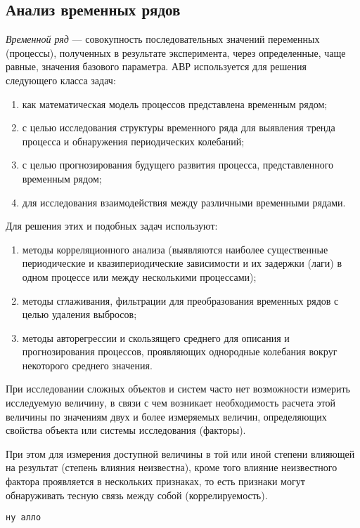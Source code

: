 \documentclass[12pt]{article}
\begin{document}
\subsection{Анализ временных рядов}
\emph{Временной ряд} --- совокупность последовательных значений переменных (процессы), полученных в результате эксперимента, через определенные, чаще равные, значения базового параметра. АВР используется для решения следующего класса задач:
\begin{enumerate}
    \item как математическая модель процессов представлена временным рядом;
    \item с целью исследования структуры временного ряда для выявления тренда процесса и обнаружения периодических колебаний;
    \item с целью прогнозирования будущего развития процесса, представленного временным рядом;
    \item для исследования взаимодействия между различными временными рядами.
\end{enumerate}

Для решения этих и подобных задач используют: 
\begin{enumerate}
    \item методы корреляционного анализа (выявляются наиболее существенные периодические и квазипериодические зависимости и их задержки (лаги) в одном процессе или между несколькими процессами);
    \item методы сглаживания, фильтрации для преобразования временных рядов с целью удаления выбросов;
    \item методы авторегрессии и скользящего среднего для описания и прогнозирования процессов, проявляющих однородные колебания вокруг некоторого среднего значения.
\end{enumerate}

При исследовании сложных объектов и систем часто нет возможности измерить исследуемую величину, в связи с чем возникает необходимость расчета этой величины по значениям двух и более измеряемых величин, определяющих свойства объекта или системы исследования (факторы).

При этом для измерения доступной величины в той или иной степени влияющей на результат (степень влияния неизвестна), кроме того влияние неизвестного фактора проявляется в нескольких признаках, то есть признаки могут обнаруживать тесную связь между собой (коррелируемость).

\begin{verbatim}ну алло\end{verbatim}
\end{document}
